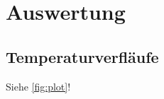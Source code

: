 \section{Auswertung}
\label{sec:Auswertung}

\subsection{Temperaturverfläufe}



Siehe \autoref{fig:plot}!

